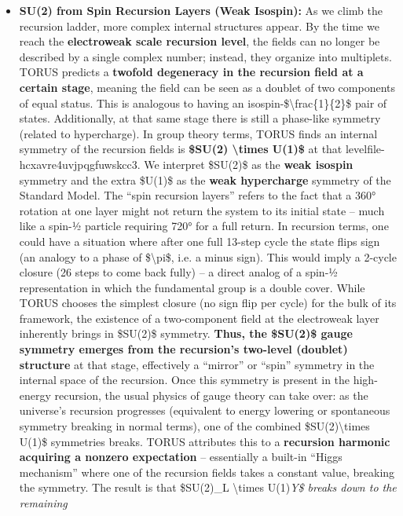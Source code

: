 \begin{itemize}
\item
  \textbf{SU(2) from Spin Recursion Layers (Weak Isospin):} As we climb
  the recursion ladder, more complex internal structures appear. By the
  time we reach the \textbf{electroweak scale recursion level}, the
  fields can no longer be described by a single complex number; instead,
  they organize into multiplets. TORUS predicts a \textbf{twofold
  degeneracy in the recursion field at a certain stage}, meaning the
  field can be seen as a doublet of two components of equal status​.
  This is analogous to having an
  isospin-\$\textbackslash{}frac\{1\}\{2\}\$ pair of states.
  Additionally, at that same stage there is still a phase-like symmetry
  (related to hypercharge). In group theory terms, TORUS finds an
  internal symmetry of the recursion fields is \textbf{\$SU(2)
  \textbackslash{}times U(1)\$} at that
  level​file-hcxavre4uvjpqgfuwskcc3. We interpret \$SU(2)\$ as the
  \textbf{weak isospin} symmetry and the extra \$U(1)\$ as the
  \textbf{weak hypercharge} symmetry of the Standard Model. The ``spin
  recursion layers'' refers to the fact that a 360° rotation at one
  layer might not return the system to its initial state -- much like a
  spin-½ particle requiring 720° for a full return. In recursion terms,
  one could have a situation where after one full 13-step cycle the
  state flips sign (an analogy to a phase of \$\textbackslash{}pi\$,
  i.e. a minus sign)​. This would imply a 2-cycle closure (26 steps to
  come back fully) -- a direct analog of a spin-½ representation in
  which the fundamental group is a double cover. While TORUS chooses the
  simplest closure (no sign flip per cycle) for the bulk of its
  framework, the existence of a two-component field at the electroweak
  layer inherently brings in \$SU(2)\$ symmetry. \textbf{Thus, the
  \$SU(2)\$ gauge symmetry emerges from the recursion's two-level
  (doublet) structure} at that stage, effectively a ``mirror'' or
  ``spin'' symmetry in the internal space of the recursion​. Once this
  symmetry is present in the high-energy recursion, the usual physics of
  gauge theory can take over: as the universe's recursion progresses
  (equivalent to energy lowering or spontaneous symmetry breaking in
  normal terms), one of the combined \$SU(2)\textbackslash{}times U(1)\$
  symmetries breaks. TORUS attributes this to a \textbf{recursion
  harmonic acquiring a nonzero expectation} -- essentially a built-in
  ``Higgs mechanism'' where one of the recursion fields takes a constant
  value, breaking the symmetry​. The result is that \$SU(2)\_L
  \textbackslash{}times U(1)\emph{Y\$ breaks down to the remaining
}
\end{itemize}
